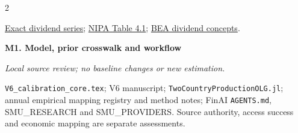 \documentclass[10pt,a4paper,landscape]{article}
\newcommand{\code}[1]{{\footnotesize\texttt{#1}}}
\begin{document}
\begin{multicols}{2}
\begin{minipage}{\linewidth}
\par \href{https://fred.stlouisfed.org/series/B3375C1Q027SBEA}{Exact dividend series}; \href{https://fred.stlouisfed.org/release/tables?eid=5405&rid=53}{NIPA Table 4.1}; \href{https://www.bea.gov/help/faq/200}{BEA dividend concepts}.

\end{minipage}\par\vspace{6pt}

\noindent\begin{minipage}{\linewidth}\raggedright

\hypertarget{src-M1}{\textbf{M1. Model, prior crosswalk and workflow}}\par

{\footnotesize\itshape Local source review; no baseline changes or new estimation.}\par

\code{V6\_calibration\_core.tex}; V6 manuscript; \code{TwoCountryProductionOLG.jl}; annual empirical mapping registry and method notes; FinAI \code{AGENTS.md}, SMU\_RESEARCH and SMU\_PROVIDERS. Source authority, access success and economic mapping are separate assessments.

\end{minipage}\par\vspace{6pt}

\end{multicols}
\end{document}
